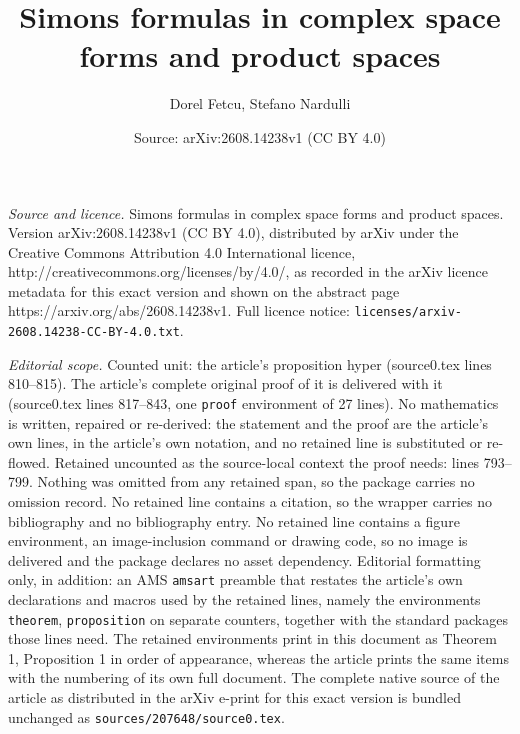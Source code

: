 \documentclass[10pt,a4paper]{amsart}
\title{Simons formulas in complex space forms and product spaces}
\author{Dorel Fetcu, Stefano Nardulli}
\date{Source: arXiv:2608.14238v1 (CC BY 4.0)}
\begin{document}
\maketitle

\noindent\emph{Source and licence.} Simons formulas in complex space forms and product spaces. Version arXiv:2608.14238v1 (CC BY 4.0), distributed by arXiv under the Creative Commons Attribution 4.0 International licence, http://creativecommons.org/licenses/by/4.0/, as recorded in the arXiv licence metadata for this exact version and shown on the abstract page https://arxiv.org/abs/2608.14238v1. Full licence notice: \texttt{licenses/arxiv-2608.14238-CC-BY-4.0.txt}.\par\smallskip

\noindent\textit{Editorial scope.} Counted unit: the article's proposition hyper (source0.tex lines 810--815). The article's complete original proof of it is delivered with it (source0.tex lines 817--843, one \texttt{proof} environment of 27 lines). No mathematics is written, repaired or re-derived: the statement and the proof are the article's own lines, in the article's own notation, and no retained line is substituted or re-flowed.  Retained uncounted as the source-local context the proof needs: lines 793--799.  Nothing was omitted from any retained span, so the package carries no omission record.  No retained line contains a citation, so the wrapper carries no bibliography and no bibliography entry.  No retained line contains a figure environment, an image-inclusion command or drawing code, so no image is delivered and the package declares no asset dependency.  Editorial formatting only, in addition: an AMS \texttt{amsart} preamble that restates the article's own declarations and macros used by the retained lines, namely the environments \texttt{theorem}, \texttt{proposition} on separate counters, together with the standard packages those lines need.  The retained environments print in this document as Theorem 1, Proposition 1 in order of appearance, whereas the article prints the same items with the numbering of its own full document.  The complete native source of the article as distributed in the arXiv e-print for this exact version is bundled unchanged as \texttt{sources/207648/source0.tex}.
\end{document}
